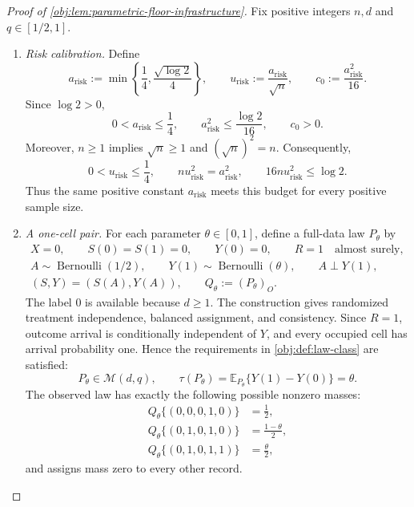 \documentclass[11pt]{article}
\begin{document}
\begin{proof}[Proof of \cref{obj:lem:parametric-floor-infrastructure}]
Fix positive integers \(n,d\) and \(q\in[1/2,1]\).

\begin{enumerate}
\item \emph{Risk calibration.}
Define
\[
a_{\mathrm{risk}}
:=
\min\left\{\frac14,\frac{\sqrt{\log 2}}4\right\},
\qquad
u_{\mathrm{risk}}
:=
\frac{a_{\mathrm{risk}}}{\sqrt n},
\qquad
c_0:=\frac{a_{\mathrm{risk}}^2}{16}.
\]
Since \(\log 2>0\),
\[
0<a_{\mathrm{risk}}\le\frac14,
\qquad
a_{\mathrm{risk}}^2\le\frac{\log 2}{16},
\qquad
c_0>0.
\]
Moreover, \(n\ge1\) implies \(\sqrt n\ge1\) and \((\sqrt n)^2=n\). Consequently,
\[
0<u_{\mathrm{risk}}\le\frac14,
\qquad
n u_{\mathrm{risk}}^2=a_{\mathrm{risk}}^2,
\qquad
16n u_{\mathrm{risk}}^2\le\log 2.
\]
Thus the same positive constant \(a_{\mathrm{risk}}\) meets this budget for every positive sample size.

\item \emph{A one-cell pair.}
For each parameter \(\theta\in[0,1]\), define a full-data law \(P_\theta\) by
\[
\begin{gathered}
X=0,\qquad S(0)=S(1)=0,\qquad Y(0)=0,\qquad R=1
\quad\text{almost surely},\\
A\sim\operatorname{Bernoulli}(1/2),\qquad
Y(1)\sim\operatorname{Bernoulli}(\theta),\qquad
A\perp Y(1),\\
(S,Y)=(S(A),Y(A)),
\qquad
Q_\theta:=(P_\theta)_O .
\end{gathered}
\]
The label \(0\) is available because \(d\ge1\). The construction gives randomized treatment independence, balanced assignment, and consistency. Since \(R=1\), outcome arrival is conditionally independent of \(Y\), and every occupied cell has arrival probability one. Hence the requirements in \cref{obj:def:law-class} are satisfied:
\[
P_\theta\in\mathcal M(d,q),
\qquad
\tau(P_\theta)
=\mathbb E_{P_\theta}\{Y(1)-Y(0)\}
=\theta.
\]
The observed law has exactly the following possible nonzero masses:
\[
\begin{aligned}
Q_\theta\{(0,0,0,1,0)\}&=\frac12,\\
Q_\theta\{(0,1,0,1,0)\}&=\frac{1-\theta}{2},\\
Q_\theta\{(0,1,0,1,1)\}&=\frac{\theta}{2},
\end{aligned}
\]
and assigns mass zero to every other record.


\end{enumerate}
\end{proof}
\end{document}
